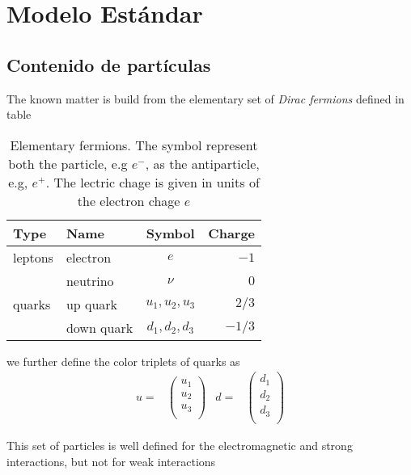\chapter{Modelo Est\'andar}
\label{cha:modelo-estandar} %

\section{Contenido de partículas}

\begin{frame}
The known matter is build from the elementary set of \emph{Dirac fermions} defined in table
\begin{table}
  \centering
  \begin{tabular}{l|l|c|r}
    Type &Name & Symbol&Charge\\\hline{}
   leptons& electron & $e$& $-1$\\
          & neutrino & $\nu$ & $0$\\\hline{}
   quarks &up quark & $u_1,u_2,u_3$ & $2/3$\\
          &down quark & $d_1,d_2,d_3$& $-1/3$\\
  \end{tabular}
  \caption{Elementary fermions. The symbol represent both the particle, e.g $e^-$, as the antiparticle, e.g, $e^+$. The lectric chage is given in units of the electron chage $e$  }
  \label{tab:ef}
\end{table}

we further define the color triplets of quarks as
\begin{align}
  u=&
  \begin{pmatrix}
    u_1 \\ u_2\\ u_3\\
  \end{pmatrix}
  &d=&
  \begin{pmatrix}
    d_1 \\ d_2 \\ d_3\\
  \end{pmatrix}
\end{align}

This set of particles is well defined for the electromagnetic and strong interactions, but not for weak interactions 


\end{frame}

